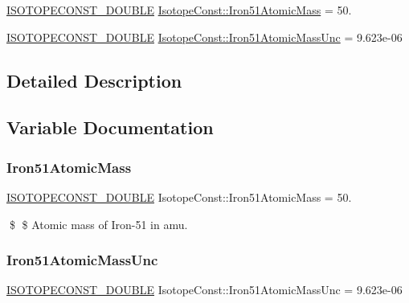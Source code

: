 \begin{DoxyCompactItemize}
\item 
\mbox{\hyperlink{group___isotope_const-_macros_ga8f45a7272ce02c0b4c65c44636ed719a}{I\+S\+O\+T\+O\+P\+E\+C\+O\+N\+S\+T\+\_\+\+D\+O\+U\+B\+LE}} \mbox{\hyperlink{group___isotope_const-_iron-_fe51_gad67e908af84333b88b03a30a640c0346}{Isotope\+Const\+::\+Iron51\+Atomic\+Mass}} = 50.
\item 
\mbox{\hyperlink{group___isotope_const-_macros_ga8f45a7272ce02c0b4c65c44636ed719a}{I\+S\+O\+T\+O\+P\+E\+C\+O\+N\+S\+T\+\_\+\+D\+O\+U\+B\+LE}} \mbox{\hyperlink{group___isotope_const-_iron-_fe51_ga41543aceb7072d85f26b9167c4636f8d}{Isotope\+Const\+::\+Iron51\+Atomic\+Mass\+Unc}} = 9.\+623e-\/06
\end{DoxyCompactItemize}


\subsection{Detailed Description}


\subsection{Variable Documentation}
\mbox{\label{group___isotope_const-_iron-_fe51_gad67e908af84333b88b03a30a640c0346}} 
\subsubsection{\texorpdfstring{Iron51\+Atomic\+Mass}{Iron51AtomicMass}}
{\footnotesize\ttfamily \mbox{\hyperlink{group___isotope_const-_macros_ga8f45a7272ce02c0b4c65c44636ed719a}{I\+S\+O\+T\+O\+P\+E\+C\+O\+N\+S\+T\+\_\+\+D\+O\+U\+B\+LE}} Isotope\+Const\+::\+Iron51\+Atomic\+Mass = 50.}

\$ \$ Atomic mass of Iron-\/51 in amu. \mbox{\label{group___isotope_const-_iron-_fe51_ga41543aceb7072d85f26b9167c4636f8d}} 
\subsubsection{\texorpdfstring{Iron51\+Atomic\+Mass\+Unc}{Iron51AtomicMassUnc}}
{\footnotesize\ttfamily \mbox{\hyperlink{group___isotope_const-_macros_ga8f45a7272ce02c0b4c65c44636ed719a}{I\+S\+O\+T\+O\+P\+E\+C\+O\+N\+S\+T\+\_\+\+D\+O\+U\+B\+LE}} Isotope\+Const\+::\+Iron51\+Atomic\+Mass\+Unc = 9.\+623e-\/06}

